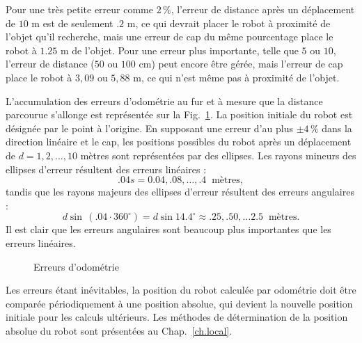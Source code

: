 Pour une très petite erreur comme $2\,\%$, l'erreur de distance après un déplacement de $10$ m est de seulement $.2$ m, ce qui devrait placer le robot à proximité de l'objet qu'il recherche, mais une erreur de cap du même pourcentage place le robot à $1.25$ m de l'objet. Pour une erreur plus importante, telle que $5$ ou $10$, l'erreur de distance ($50$ ou $100$ cm) peut encore être gérée, mais l'erreur de cap place le robot à $3,09$ ou $5,88$ m, ce qui n'est même pas à proximité de l'objet.

L'accumulation des erreurs d'odométrie au fur et à mesure que la distance parcourue s'allonge est représentée sur la Fig.~\ref{fig.odo-errors}. La position initiale du robot est désignée par le point à l'origine.  En supposant une erreur d'au plus $\pm 4\,\%$ dans la direction linéaire et le cap, les positions possibles du robot après un déplacement de $d=1,2,\ldots,10$ mètres sont représentées par des ellipses. Les rayons mineurs des ellipses d'erreur résultent des erreurs linéaires :
\[.04s = 0.04, .08, \ldots, .4 \;\;\textrm{mètres},
\]
tandis que les rayons majeurs des ellipses d'erreur résultent des erreurs angulaires :
\[
d\sin \,(.04\cdot 360^\circ)=d \sin 14.4^\circ \approx{} .25, .50, \ldots 2.5\;\;\textrm{mètres}.
\]
Il est clair que les erreurs angulaires sont beaucoup plus importantes que les erreurs linéaires.

\begin{figure}
\begin{center}
\end{center}
\caption{Erreurs d'odométrie}\label{fig.odo-errors}
\end{figure}

Les erreurs étant inévitables, la position du robot calculée par odométrie doit être comparée périodiquement à une position absolue, qui devient la nouvelle position initiale pour les calculs ultérieurs. Les méthodes de détermination de la position absolue du robot sont présentées au Chap.~\ref{ch.local}.

